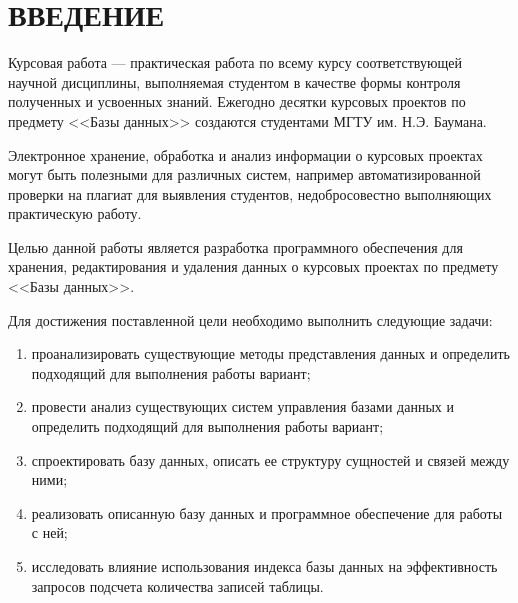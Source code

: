 \newpage
\chapter*{\centering ВВЕДЕНИЕ}



Курсовая работа \cite{coursework} --- практическая работа по всему курсу соответствующей научной дисциплины, выполняемая студентом в качестве формы контроля полученных и усвоенных знаний. Ежегодно десятки курсовых проектов по предмету <<Базы данных>> создаются студентами МГТУ им. Н.Э. Баумана.

Электронное хранение, обработка и анализ информации о курсовых проектах могут быть полезными для различных систем, например автоматизированной проверки на плагиат для выявления студентов, недобросовестно выполняющих практическую работу.


Целью данной работы является разработка программного обеспечения для хранения, редактирования и удаления данных о курсовых проектах по предмету <<Базы данных>>.

Для достижения поставленной цели необходимо выполнить следующие задачи:
\begin{enumerate}
	\item проанализировать существующие методы представления данных и определить подходящий для выполнения работы вариант;
	\item провести анализ существующих систем управления базами данных и определить подходящий для выполнения работы вариант;
	\item спроектировать базу данных, описать ее структуру сущностей и связей между ними;
	\item реализовать описанную базу данных и программное обеспечение для работы с ней;
	\item исследовать влияние использования индекса базы данных на эффективность запросов подсчета количества записей таблицы.
\end{enumerate}

